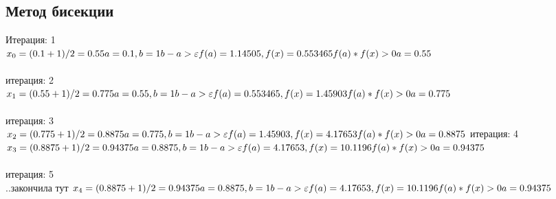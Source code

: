 \documentclass{article}
\begin{document}
\subsection{Метод бисекции}
Итерация: 1 \\
\begin{math}
  x_{0}= (0.1+1)/2 = 0.55\\
  a=0.1, b=1\\
  b-a > \varepsilon \\
  f(a) = 1.14505, f(x) = 0.553465\\
  f(a) * f(x) > 0\\
  a = 0.55
\end{math}\\\\
итерация: 2\\
\begin{math}
  x_{1}= (0.55+1)/2 = 0.775\\
  a=0.55, b=1\\
  b-a > \varepsilon \\
  f(a) = 0.553465, f(x) = 1.45903\\
  f(a) * f(x) > 0\\
  a = 0.775
\end{math}\\\\
итерация: 3\\
\begin{math}
  x_{2}= (0.775+1)/2 = 0.8875\\
  a=0.775, b=1\\
  b-a > \varepsilon \\
  f(a) = 1.45903, f(x) = 4.17653\\
  f(a) * f(x) > 0\\
  a = 0.8875
\end{math}
итерация: 4
\begin{math}
  x_{3}= (0.8875+1)/2 = 0.94375\\
  a=0.8875, b=1\\
  b-a > \varepsilon \\
  f(a) = 4.17653, f(x) = 10.1196\\
  f(a) * f(x) > 0\\
  a = 0.94375
\end{math}\\\\
итерация: 5\\
..закончила тут
\begin{math}
  x_{4}= (0.8875+1)/2 = 0.94375\\
  a=0.8875, b=1\\
  b-a > \varepsilon \\
  f(a) = 4.17653, f(x) = 10.1196\\
  f(a) * f(x) > 0\\
  a = 0.94375
\end{math}\\\\
\end{document}
